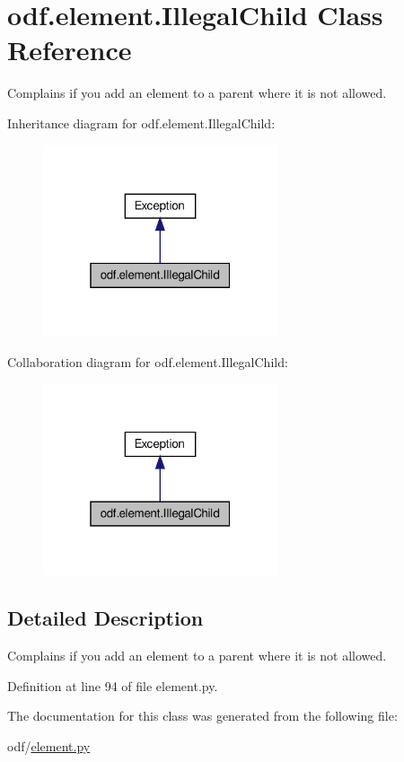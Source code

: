 \hypertarget{classodf_1_1element_1_1IllegalChild}{\section{odf.\+element.\+Illegal\+Child Class Reference}
\label{classodf_1_1element_1_1IllegalChild}
}


Complains if you add an element to a parent where it is not allowed.  




Inheritance diagram for odf.\+element.\+Illegal\+Child\+:
\nopagebreak
\begin{figure}[H]
\begin{center}
\leavevmode
\includegraphics[width=196pt]{classodf_1_1element_1_1IllegalChild__inherit__graph}
\end{center}
\end{figure}


Collaboration diagram for odf.\+element.\+Illegal\+Child\+:
\nopagebreak
\begin{figure}[H]
\begin{center}
\leavevmode
\includegraphics[width=196pt]{classodf_1_1element_1_1IllegalChild__coll__graph}
\end{center}
\end{figure}


\subsection{Detailed Description}
Complains if you add an element to a parent where it is not allowed. 

Definition at line 94 of file element.\+py.



The documentation for this class was generated from the following file\+:\begin{DoxyCompactItemize}
\item 
odf/\hyperlink{element_8py}{element.\+py}\end{DoxyCompactItemize}
